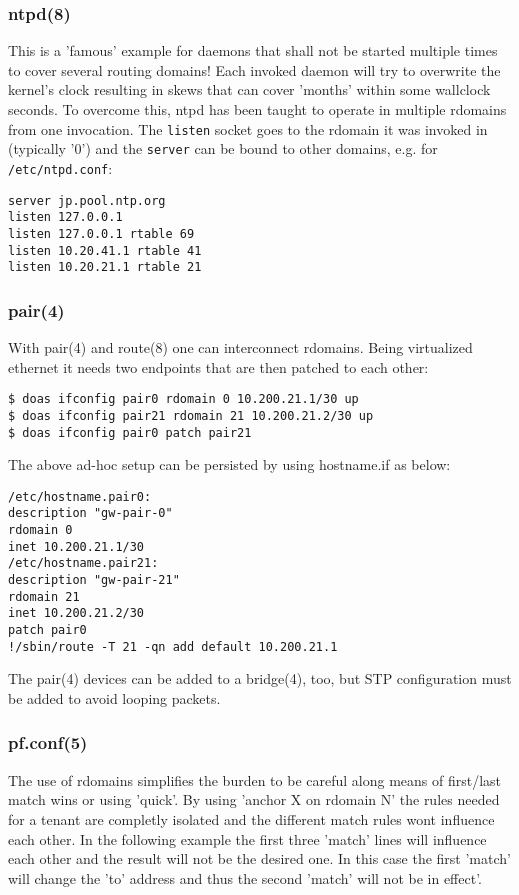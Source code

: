\documentclass[letterpaper,twocolumn,10pt]{article}
\begin{document}
\subsubsection{ntpd(8)}
This is a 'famous' example for daemons that shall not be started multiple times to cover several routing domains!
Each invoked daemon will try to overwrite the kernel's clock resulting in skews that can cover 'months' within some wallclock seconds.
To overcome this, ntpd has been taught to operate in multiple rdomains from one invocation. The {\tt listen} socket goes to the rdomain it was invoked in (typically '0') and the {\tt server} can be bound to other domains, e.g. for 
{\tt /etc/ntpd.conf}:
\begin{verbatim}
server jp.pool.ntp.org
listen 127.0.0.1
listen 127.0.0.1 rtable 69
listen 10.20.41.1 rtable 41
listen 10.20.21.1 rtable 21
\end{verbatim}

\subsubsection{pair(4)}
With pair(4) and route(8) one can interconnect rdomains. Being virtualized ethernet it needs two endpoints that are then patched to each other:
\begin{verbatim}
$ doas ifconfig pair0 rdomain 0 10.200.21.1/30 up
$ doas ifconfig pair21 rdomain 21 10.200.21.2/30 up
$ doas ifconfig pair0 patch pair21
\end{verbatim}
The above ad-hoc setup can be persisted by using hostname.if as below:
\begin{verbatim}
/etc/hostname.pair0:
description "gw-pair-0"
rdomain 0
inet 10.200.21.1/30
/etc/hostname.pair21:
description "gw-pair-21"
rdomain 21
inet 10.200.21.2/30
patch pair0
!/sbin/route -T 21 -qn add default 10.200.21.1
\end{verbatim}
The pair(4) devices can be added to a bridge(4), too, but STP configuration must be added to avoid looping packets.

\subsubsection{pf.conf(5)}
The use of rdomains simplifies the burden to be careful along means of first/last match wins or using 'quick'.
By using 'anchor X on rdomain N' the rules needed for a tenant are completly isolated and the different match rules
wont influence each other. In the following example the first three 'match' lines will influence each other and the
result will not be the desired one. In this case the first 'match' will change the 'to' address and thus the second
'match' will not be in effect'.
\end{document}

